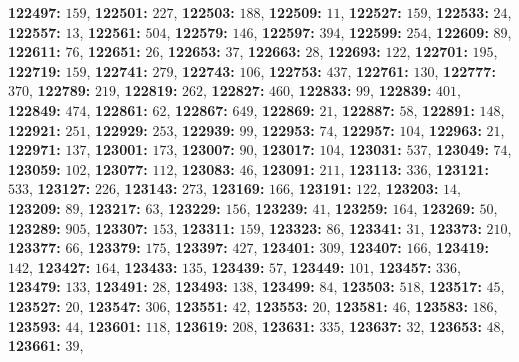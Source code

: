 \textsf{\bfseries 122497:} $159$, \textsf{\bfseries 122501:} $227$, \textsf{\bfseries 122503:} $188$, \textsf{\bfseries 122509:} $11$, \textsf{\bfseries 122527:} $159$, \textsf{\bfseries 122533:} $24$, \textsf{\bfseries 122557:} $13$, \textsf{\bfseries 122561:} $504$, \textsf{\bfseries 122579:} $146$, \textsf{\bfseries 122597:} $394$, \textsf{\bfseries 122599:} $254$, \textsf{\bfseries 122609:} $89$, \textsf{\bfseries 122611:} $76$, \textsf{\bfseries 122651:} $26$, \textsf{\bfseries 122653:} $37$, \textsf{\bfseries 122663:} $28$, \textsf{\bfseries 122693:} $122$, \textsf{\bfseries 122701:} $195$, \textsf{\bfseries 122719:} $159$, \textsf{\bfseries 122741:} $279$, \textsf{\bfseries 122743:} $106$, \textsf{\bfseries 122753:} $437$, \textsf{\bfseries 122761:} $130$, \textsf{\bfseries 122777:} $370$, \textsf{\bfseries 122789:} $219$, \textsf{\bfseries 122819:} $262$, \textsf{\bfseries 122827:} $460$, \textsf{\bfseries 122833:} $99$, \textsf{\bfseries 122839:} $401$, \textsf{\bfseries 122849:} $474$, \textsf{\bfseries 122861:} $62$, \textsf{\bfseries 122867:} $649$, \textsf{\bfseries 122869:} $21$, \textsf{\bfseries 122887:} $58$, \textsf{\bfseries 122891:} $148$, \textsf{\bfseries 122921:} $251$, \textsf{\bfseries 122929:} $253$, \textsf{\bfseries 122939:} $99$, \textsf{\bfseries 122953:} $74$, \textsf{\bfseries 122957:} $104$, \textsf{\bfseries 122963:} $21$, \textsf{\bfseries 122971:} $137$, \textsf{\bfseries 123001:} $173$, \textsf{\bfseries 123007:} $90$, \textsf{\bfseries 123017:} $104$, \textsf{\bfseries 123031:} $537$, \textsf{\bfseries 123049:} $74$, \textsf{\bfseries 123059:} $102$, \textsf{\bfseries 123077:} $112$, \textsf{\bfseries 123083:} $46$, \textsf{\bfseries 123091:} $211$, \textsf{\bfseries 123113:} $336$, \textsf{\bfseries 123121:} $533$, \textsf{\bfseries 123127:} $226$, \textsf{\bfseries 123143:} $273$, \textsf{\bfseries 123169:} $166$, \textsf{\bfseries 123191:} $122$, \textsf{\bfseries 123203:} $14$, \textsf{\bfseries 123209:} $89$, \textsf{\bfseries 123217:} $63$, \textsf{\bfseries 123229:} $156$, \textsf{\bfseries 123239:} $41$, \textsf{\bfseries 123259:} $164$, \textsf{\bfseries 123269:} $50$, \textsf{\bfseries 123289:} $905$, \textsf{\bfseries 123307:} $153$, \textsf{\bfseries 123311:} $159$, \textsf{\bfseries 123323:} $86$, \textsf{\bfseries 123341:} $31$, \textsf{\bfseries 123373:} $210$, \textsf{\bfseries 123377:} $66$, \textsf{\bfseries 123379:} $175$, \textsf{\bfseries 123397:} $427$, \textsf{\bfseries 123401:} $309$, \textsf{\bfseries 123407:} $166$, \textsf{\bfseries 123419:} $142$, \textsf{\bfseries 123427:} $164$, \textsf{\bfseries 123433:} $135$, \textsf{\bfseries 123439:} $57$, \textsf{\bfseries 123449:} $101$, \textsf{\bfseries 123457:} $336$, \textsf{\bfseries 123479:} $133$, \textsf{\bfseries 123491:} $28$, \textsf{\bfseries 123493:} $138$, \textsf{\bfseries 123499:} $84$, \textsf{\bfseries 123503:} $518$, \textsf{\bfseries 123517:} $45$, \textsf{\bfseries 123527:} $20$, \textsf{\bfseries 123547:} $306$, \textsf{\bfseries 123551:} $42$, \textsf{\bfseries 123553:} $20$, \textsf{\bfseries 123581:} $46$, \textsf{\bfseries 123583:} $186$, \textsf{\bfseries 123593:} $44$, \textsf{\bfseries 123601:} $118$, \textsf{\bfseries 123619:} $208$, \textsf{\bfseries 123631:} $335$, \textsf{\bfseries 123637:} $32$, \textsf{\bfseries 123653:} $48$, \textsf{\bfseries 123661:} $39$, 
